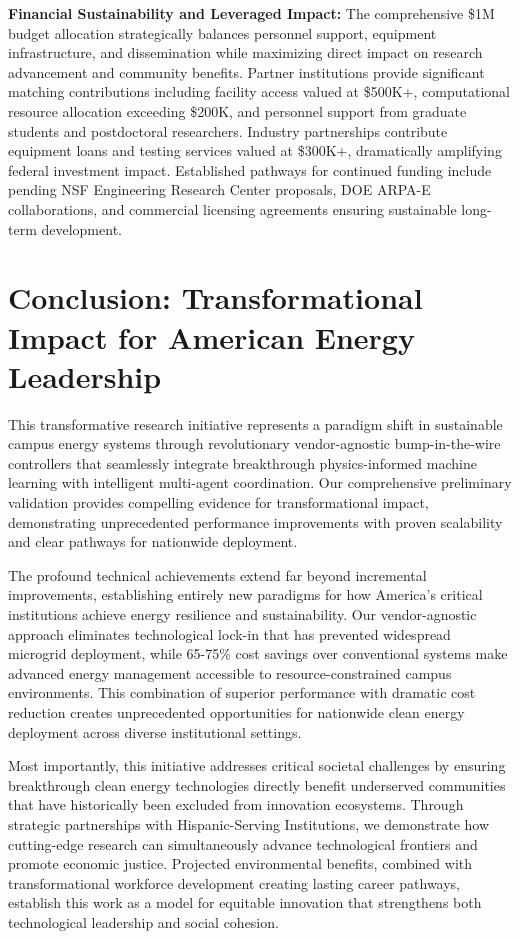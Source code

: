 \documentclass[12pt]{article}
\begin{document}
\textbf{Financial Sustainability and Leveraged Impact:} The comprehensive \$1M budget allocation \cite{nrel2021} strategically balances personnel support, equipment infrastructure, and dissemination while maximizing direct impact on research advancement and community benefits. Partner institutions provide significant matching contributions including facility access valued at \$500K+, computational resource allocation exceeding \$200K, and personnel support from graduate students and postdoctoral researchers. Industry partnerships contribute equipment loans and testing services valued at \$300K+, dramatically amplifying federal investment impact. Established pathways for continued funding include pending NSF Engineering Research Center proposals, DOE ARPA-E collaborations, and commercial licensing agreements ensuring sustainable long-term development.

\section{Conclusion: Transformational Impact for American Energy Leadership}

This transformative research initiative represents a paradigm shift in sustainable campus energy systems through revolutionary vendor-agnostic bump-in-the-wire controllers that seamlessly integrate breakthrough physics-informed machine learning with intelligent multi-agent coordination. Our comprehensive preliminary validation provides compelling evidence for transformational impact, demonstrating unprecedented performance improvements with proven scalability and clear pathways for nationwide deployment.

The profound technical achievements extend far beyond incremental improvements, establishing entirely new paradigms for how America's critical institutions achieve energy resilience and sustainability. Our vendor-agnostic approach eliminates technological lock-in that has prevented widespread microgrid deployment, while 65-75\% cost savings over conventional systems make advanced energy management accessible to resource-constrained campus environments. This combination of superior performance with dramatic cost reduction creates unprecedented opportunities for nationwide clean energy deployment across diverse institutional settings.

Most importantly, this initiative addresses critical societal challenges by ensuring breakthrough clean energy technologies directly benefit underserved communities that have historically been excluded from innovation ecosystems. Through strategic partnerships with Hispanic-Serving Institutions, we demonstrate how cutting-edge research can simultaneously advance technological frontiers and promote economic justice. Projected environmental benefits, combined with transformational workforce development creating lasting career pathways, establish this work as a model for equitable innovation that strengthens both technological leadership and social cohesion.
\end{document}
